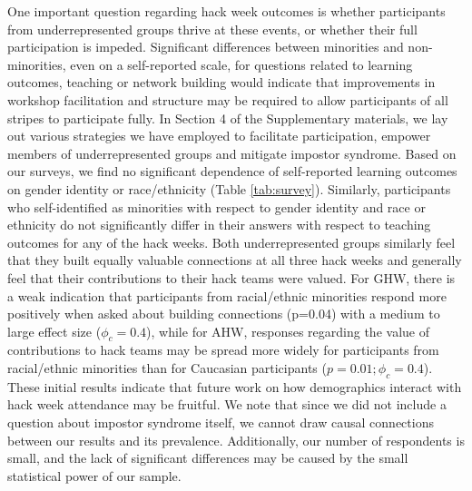 One important question regarding hack week outcomes is whether participants from underrepresented groups thrive at these events, or whether their full participation is impeded. Significant differences between minorities and non-minorities, even on a self-reported scale, for questions related to learning outcomes, teaching or network building would indicate that improvements in workshop facilitation and structure may be required to allow participants of all stripes to participate fully.
In Section 4 of the Supplementary materials, we lay out various strategies we have employed to facilitate participation, empower members of underrepresented groups and mitigate impostor syndrome. Based on our surveys, we find no significant dependence of self-reported learning outcomes on gender identity or race/ethnicity (Table \ref{tab:survey}). Similarly, participants who self-identified as minorities with respect to gender identity and race or ethnicity do not significantly differ in their answers with respect to teaching outcomes for any of the hack weeks. Both underrepresented groups similarly feel that they built equally valuable connections at all three hack weeks and generally feel that their contributions to their hack teams were valued. For GHW, there is a weak indication that participants from racial/ethnic minorities respond more positively when asked about building connections (p=0.04) with a medium to large effect size ($\phi_c = 0.4$), while for AHW, responses regarding the value of contributions to hack teams may be spread more widely for participants from racial/ethnic minorities than for Caucasian participants ($p = 0.01; \phi_c = 0.4$). These initial results indicate that future work on how demographics interact with hack week attendance may be fruitful. We note that since we did not include a question about impostor syndrome itself, we cannot draw causal connections between our results and its prevalence. Additionally, our number of respondents is small, and the lack of significant differences may be caused by the small statistical power of our sample.


